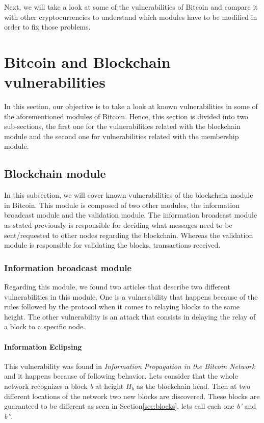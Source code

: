 Next, we will take a look at some of the vulnerabilities of Bitcoin and compare it with other cryptocurrencies to understand which modules have to be modified in order to fix those problems.


\section{Bitcoin and Blockchain vulnerabilities}
\label{sec:vulnerabilities}
In this section, our objective is to take a look at known vulnerabilities in some of the aforementioned modules of Bitcoin. Hence, this section is divided into two sub-sections, the first one for the vulnerabilities related with the blockchain module and the second one for vulnerabilities related with the membership module.

\subsection{Blockchain module}
\label{sec:b_module}

In this subsection, we will cover known vulnerabilities of the blockchain module in Bitcoin. This module is composed of two other modules, the information broadcast module and the validation module. The information broadcast module as stated previously is responsible for deciding what messages need to be sent/requested to other nodes regarding the blockchain. Whereas the validation module is responsible for validating the blocks, transactions received.

\subsubsection{Information broadcast module}
\label{sec:info_broad_module}
Regarding this module, we found two articles that describe two different vulnerabilities in this module. One is a vulnerability that happens because of the rules followed by the protocol when it comes to relaying blocks to the same height. The other vulnerability is an attack that consists in delaying the relay of a block to a specific node.

\paragraph*{Information Eclipsing}
\label{sec:ieclipsing}
This vulnerability was found in \textit{Information Propagation in the Bitcoin Network}~\cite{decker2013information} and it happens because of following behavior. Lets consider that the whole network recognizes a block \textit{b} at height $H_b$ as the blockchain head. Then at two different locations of the network two new blocks are discovered. These blocks are guaranteed to be different as seen in Section\ref{sec:blocks}, lets call each one \textit{b'} and \textit{b''}.

